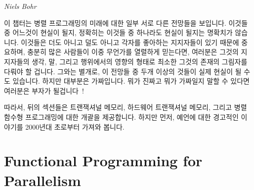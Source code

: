 
%
	 {\emph{Niels Bohr}}

이 챕터는 병렬 프로그래밍의 미래에 대한 일부 서로 다른 전망들을 보입니다.
이것들 중 어느것이 현실이 될지, 정확히는 이것들 중 하나라도 현실이 될지는
명확치가 않습니다.
이것들은 더도 아니고 덜도 아니고 각자를 좋아하는 지지자들이 있기 때문에
중요하며, 충분히 많은 사람들이 이중 무언가를 열렬하게 믿는다면, 여러분은 그것의
지지자들의 생각, 말, 그리고 행위에서의 영향의 형태로 최소한 그것의 존재의
그림자를 다뤄야 할 겁니다.
그와는 별개로, 이 전망들 중 두개 이상의 것들이 실제 현실이 될 수도 있습니다.
하지만 대부분은 가짜입니다.
뭐가 진짜고 뭐가 가짜일지 말할 수 있다면 여러분은 부자가
될겁니다~\cite{KeithRSpitz1977}!

따라서, 뒤의 섹션들은 트랜잭셔널 메모리, 하드웨어 트랜잭셔널 메모리, 그리고
병렬 함수형 프로그래밍에 대한 개괄을 제공합니다.
하지만 먼저, 예언에 대한 경고적인 이야기를 2000년대 초로부터 가져와 봅니다.
\iffalse

This chapter presents some conflicting visions of the future of parallel
programming.
It is not clear which of these will come to pass, in fact, it is not
clear that any of them will.
They are nevertheless important because each vision has its devoted
adherents, and if enough people believe in something fervently enough,
you will need to deal with at least the shadow of that thing's existence
in the form of its
influence on the thoughts, words, and deeds of its adherents.
Besides which, it is entirely possible that one or more of these visions
will actually come to pass.
But most are bogus.
Tell which is which and you'll be rich~\cite{KeithRSpitz1977}!

Therefore, the following sections give an overview of transactional
memory, hardware transactional memory, and
parallel functional programming.
But first, a cautionary tale on prognostication taken from the early 2000s.
\fi





\section{Functional Programming for Parallelism}
\label{sec:future:Functional Programming for Parallelism}

